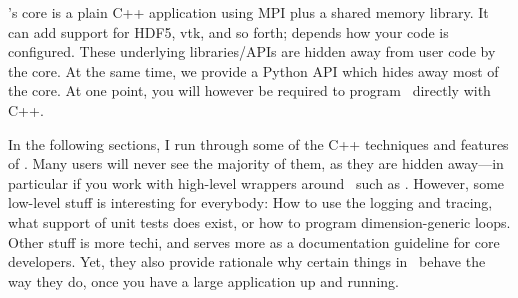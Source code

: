 
\noindent
\Peano's core is a plain C++ application using MPI plus a shared memory
library.
It can add support for HDF5, vtk, and so forth;
depends how your code is configured.
These underlying libraries/APIs are hidden away from user code by the core.
At the same time, we provide a Python API which hides away most of the core.
At one point, you will however be required to program \Peano\ directly with C++. 


In the following sections, I run through some of the C++ techniques and features
of \Peano.
Many users will never see the majority of them, as they are hidden away---in
particular if you work with high-level wrappers around \Peano\ such as \ExaHyPE.
However, some low-level stuff is interesting for everybody: How to use the
logging and tracing, what support of unit tests does exist, or how to program
dimension-generic loops.
Other stuff is more techi, and serves more as a documentation guideline for core
developers.
Yet, they also provide rationale why certain things in \Peano\ behave the way
they do, once you have a large application up and running.



 
 
